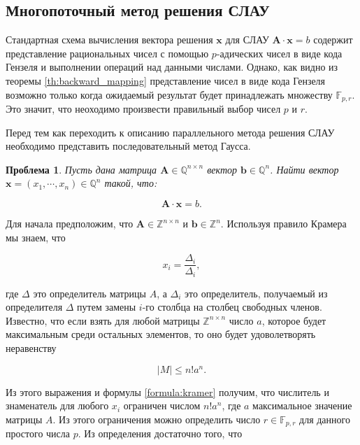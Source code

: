 \documentclass[master, och, diploma, times]{sty/SCWorks}
\theoremstyle{plain}
\newtheorem{problem}{Проблема}[section]
\theoremstyle{definition}
\numberwithin{equation}{section}
\begin{document}
\subsection{Многопоточный метод решения СЛАУ}
Стандартная схема вычисления вектора решения $\boldsymbol{x}$ для СЛАУ $\boldsymbol{A}\cdot \boldsymbol{x} = b$ содержит представление рациональных чисел с помощью $p$-адических чисел в виде кода Гензеля и выполнении операций над данными числами. Однако, как видно из теоремы \ref{th:backward_mapping} представление чисел в виде кода Гензеля возможно только когда ожидаемый результат будет принадлежать множеству $\mathbb{F}_{p,r}$. Это значит, что неоходимо  произвести правильный выбор чисел $p$ и $r$.


Перед тем как переходить к описанию параллельного метода решения СЛАУ необходимо представить последовательный метод Гаусса.

\begin{problem}
Пусть дана матрица $\boldsymbol{A} \in \mathbb{Q}^{n \times n}$ вектор $\boldsymbol{b} \in \mathbb{Q}^{n}$. Найти вектор $\boldsymbol{x}=(x_1,\cdots,x_n) \in \mathbb{Q}^{n}$ такой, что:

\begin{equation}
\boldsymbol{A}\cdot \boldsymbol{x} = b.
\end{equation}

\end{problem}

Для начала предположим, что $\boldsymbol{A} \in \mathbb{Z}^{n \times n}$ и $\boldsymbol{b} \in \mathbb{Z}^{n}$. Используя правило Крамера мы знаем, что 

\begin{equation}\label{formula:kramer}
x_i=\frac{\Delta_i}{\Delta_i},	
\end{equation}

\noindent где $\Delta$ это определитель матрицы $A$, а $\Delta_i$ это определитель, получаемый из определителя $\Delta$ путем замены $i$-го столбца на столбец свободных членов. Известно, что если взять для любой матрицы $\mathbb{Z}^{n \times n}$ число $a$, которое будет максимальным среди остальных элементов, то оно будет удоволетворять неравенству

\begin{equation}
\mid M \mid \leq n!a^n.
\end{equation}

\noindent Из этого выражения и формулы \ref{formula:kramer} получим, что числитель и знаменатель для любого $x_i$ ограничен числом $n!a^n$, где $a$ максимальное значение матрицы $A$. Из этого ограничения можно определить число $r \in \mathbb{F}_{p,r}$ для данного простого числа $p$. Из определения достаточно того, что
\end{document}
